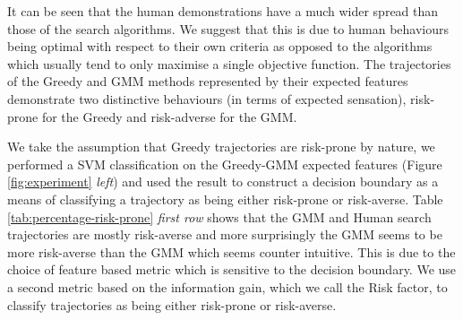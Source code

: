 It can be seen that the human demonstrations have a much wider spread than those of the search algorithms. 
We suggest that this is due to human behaviours being optimal with respect to their own criteria as opposed to the algorithms 
which usually tend to only maximise a single objective function. The trajectories of the Greedy and GMM methods represented by their 
expected features demonstrate two distinctive behaviours (in terms of expected sensation), risk-prone for the Greedy and risk-adverse
for the GMM.

We take the assumption that Greedy trajectories are risk-prone by nature, we performed a SVM classification on the 
Greedy-GMM expected features (Figure \ref{fig:experiment} \textit{left}) and used the result to construct a decision boundary as a means
of classifying a trajectory as being either risk-prone or risk-averse. Table \ref{tab:percentage-risk-prone} \textit{first row} shows that
the GMM and Human search trajectories are mostly risk-averse and more surprisingly the GMM seems to be more risk-averse than
the GMM which seems counter intuitive. This is due to the choice of feature based metric which is sensitive to the decision boundary. 
We use a second metric based on the information gain, which we call the Risk factor, to classify trajectories as being either risk-prone or risk-averse.


